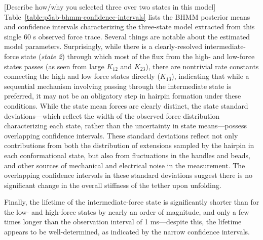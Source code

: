 \documentclass[aps,pre,twocolumn,superscriptaddress,nofootinbib,longbibliography]{revtex4-1}
\begin{document}
{{\color{magenta}[Describe how/why you selected three over two states in this model]}
Table~\ref{table:p5ab-bhmm-confidence-intervals} lists the BHMM posterior means and confidence intervals characterizing the three-state model extracted from this single 60 s observed force trace.
Several things are notable about the estimated model parameters.
Surprisingly, while there is a clearly-resolved intermediate-force state (\emph{state 2}) through which most of the flux from the high- and low-force states passes (as seen from large $K_{12}$ and $K_{23}$), there are nontrivial rate constants connecting the high and low force states directly ($K_{13}$), indicating that while a sequential mechanism involving passing through the intermediate state is preferred, it may not be an obligatory step in hairpin formation under these conditions.
While the state mean forces are clearly distinct, the state standard deviations---which reflect the width of the observed force distribution characterizing each state, rather than the uncertainty in state means---possess overlapping confidence intervals.
These standard deviations reflect not only contributions from both the distribution of extensions sampled by the hairpin in each conformational state, but also from fluctuations in the handles and beads, and other sources of mechanical and electrical noise in the measurement.
The overlapping confidence intervals in these standard deviations suggest there is no significant change in the overall stiffness of the tether upon unfolding.

Finally, the lifetime of the intermediate-force state is significantly shorter than for the low- and high-force states by nearly an order of magnitude, and only a few times longer than the observation interval of 1 ms---despite this, the lifetime appears to be well-determined, as indicated by the narrow confidence intervals.

}
\end{document}
